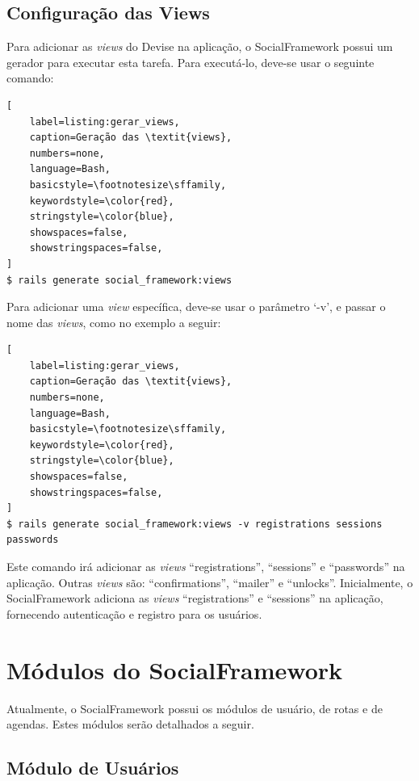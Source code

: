 \subsection{Configuração das Views}

Para adicionar as \textit{views} do Devise na aplicação, o SocialFramework possui um gerador para executar esta tarefa. Para executá-lo, deve-se usar o seguinte comando:

\begin{lstlisting}[
    label=listing:gerar_views,
    caption=Geração das \textit{views},
    numbers=none,
    language=Bash,
    basicstyle=\footnotesize\sffamily,
    keywordstyle=\color{red},
    stringstyle=\color{blue},
    showspaces=false,
    showstringspaces=false,
]
$ rails generate social_framework:views
\end{lstlisting}

Para adicionar uma \textit{view} específica, deve-se usar o parâmetro `-v', e passar o nome das \textit{views}, como no exemplo a seguir:

\begin{lstlisting}[
    label=listing:gerar_views,
    caption=Geração das \textit{views},
    numbers=none,
    language=Bash,
    basicstyle=\footnotesize\sffamily,
    keywordstyle=\color{red},
    stringstyle=\color{blue},
    showspaces=false,
    showstringspaces=false,
]
$ rails generate social_framework:views -v registrations sessions passwords
\end{lstlisting}

Este comando irá adicionar as \textit{views} ``registrations'', ``sessions'' e ``passwords'' na aplicação. Outras \textit{views} são: ``confirmations'', ``mailer'' e ``unlocks''. Inicialmente, o SocialFramework adiciona as \textit{views} ``registrations'' e ``sessions'' na aplicação, fornecendo autenticação e registro para os usuários.

\section{Módulos do SocialFramework}
\label{sec:modulos_socialframework}

Atualmente, o SocialFramework possui os módulos de usuário, de rotas e de agendas. Estes módulos serão detalhados a seguir.

\subsection{Módulo de Usuários}


